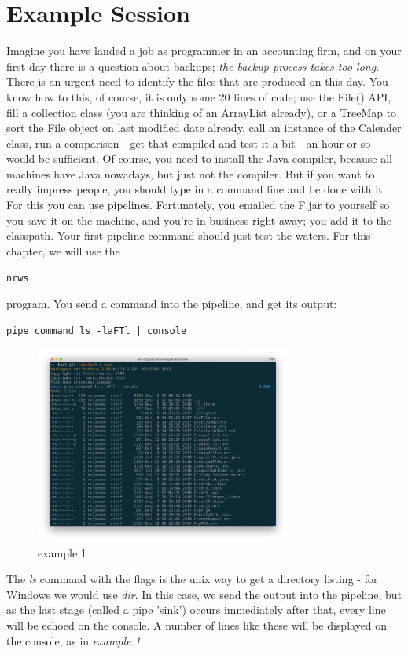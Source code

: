 \chapter{Example Session}
Imagine you have landed a job as programmer in an accounting firm,
and on your first day there is a question about backups; \emph{the backup
process takes too long}. There is an urgent need to identify the files that are produced on this day. You know how to this, of course, it is only some 20 lines of code; use the File() API, fill a collection class (you are thinking of an ArrayList already), or a TreeMap to sort the File object on last modified date already, call an instance of the Calender class, run a comparison - get that compiled and test it a bit - an hour or so would be sufficient. Of course, you need to install the Java compiler, because all machines have Java nowadays, but just not the compiler.
But if you want to really impress people, you should type in a command line and be done with it. For this you can use \nr{} pipelines. Fortunately, you emailed the \nr{}F.jar to yourself so you save it on the machine, and you're in business right away; you add it to the classpath.
Your first pipeline command should just test the waters. For this
chapter, we will use the \begin{alltt}nrws\end{alltt} program. You send a
command into the pipeline, and get its output:
\begin{lstlisting}
pipe command ls -laFTl | console
\end{lstlisting}
\begin{figure}[H]
  \includegraphics[width=0.75\textwidth]{images/example1.png}
  \caption{example 1}
  \label{fig:example1}
\end{figure}

The \emph{ls} command with the flags is the unix way to get a
directory listing - for Windows we would use \emph{dir}. In this case, we send the output into the pipeline, but as the last stage (called a pipe 'sink') occurs immediately after that, every line will be echoed on the console.
A number of lines like these will be displayed on the console, as in
\emph{example 1}.


